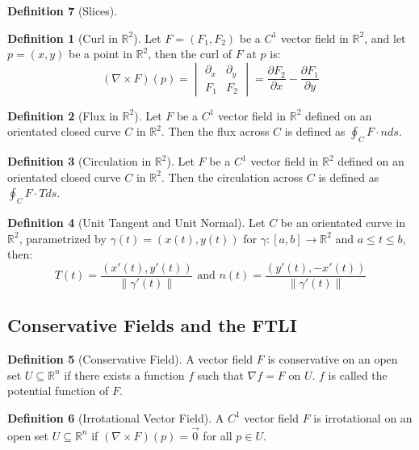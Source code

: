 \documentclass[12pt]{article}
\theoremstyle{definition}
\newtheorem{definition}{Definition}[subsection]
\theoremstyle{remark}
\begin{document}
\begin{definition}[Slices]
\begin{definition}[Curl in $\mathbb{R}^2$]
Let $F=(F_1,F_2)$ be a $C^1$ vector field in $\mathbb{R}^2$, and let $p=(x,y)$ be a point in $\mathbb{R}^2$, then the curl of $F$ at $p$ is:
\[
(\nabla \times F)(p)=\begin{vmatrix}\partial_x&\partial_y\\F_1&F_2\end{vmatrix}=\frac{\partial F_2}{\partial x}-\frac{\partial F_1}{\partial y}
\]
\end{definition}

\begin{definition}[Flux in $\mathbb{R}^2$]
Let $F$ be a $C^1$ vector field in $\mathbb{R}^2$ defined on an orientated closed curve $C$ in $\mathbb{R}^2$. Then the flux across $C$ is defined as $\displaystyle\oint_CF\cdot nds$.
\end{definition}

\begin{definition}[Circulation in $\mathbb{R}^2$]
Let $F$ be a $C^1$ vector field in $\mathbb{R}^2$ defined on an orientated closed curve $C$ in $\mathbb{R}^2$. Then the circulation across $C$ is defined as $\displaystyle\oint_CF\cdot Tds$.
\end{definition}

\begin{definition}[Unit Tangent and Unit Normal]
Let $C$ be an orientated curve in $\mathbb{R}^2$, parametrized by $\gamma(t)=(x(t),y(t))$ for $\gamma:[a,b]\to\mathbb{R}^2$ and $a\le t\le b$, then:
\[
T(t)=\frac{(x'(t),y'(t))}{\|\gamma'(t)\|} \text{ and }n(t)=\frac{(y'(t),-x'(t))}{\|\gamma'(t)\|}
\]
\end{definition}

\subsection{Conservative Fields and the FTLI}
\begin{definition}[Conservative Field]
A vector field $F$ is conservative on an open set $U\subseteq\mathbb{R}^n$ if there exists a function $f$ such that $\nabla f=F$ on $U$. $f$ is called the potential function of $F$.
\end{definition}

\begin{definition}[Irrotational Vector Field]
A $C^1$ vector field $F$ is irrotational on an open set $U\subseteq\mathbb{R}^n$ if $(\nabla\times F)(p)=\vec0$ for all $p\in U$.
\end{definition}


\end{definition}
\end{document}

